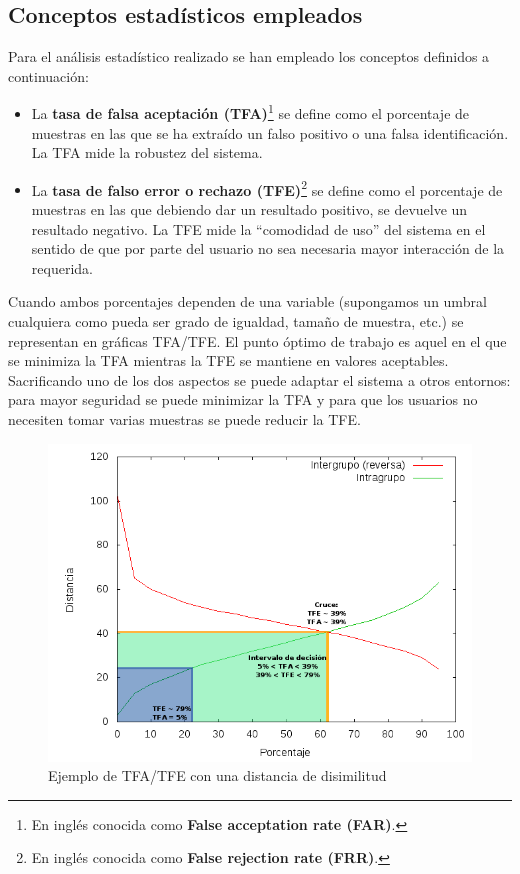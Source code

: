 \subsection{Conceptos estadísticos empleados}
Para el análisis estadístico realizado se han empleado los conceptos definidos a continuación\cite{FRRstatistics}:
\begin{itemize}
	\item{La \textbf{tasa de falsa aceptación (TFA)}\footnote{En inglés conocida como \textbf{False acceptation rate (FAR)}.} se define como el porcentaje de muestras en las que se ha extraído un falso positivo o una falsa identificación. La TFA mide la robustez del sistema.}
	\item{La \textbf{tasa de falso error o rechazo (TFE)}\footnote{En inglés conocida como \textbf{False rejection rate (FRR)}.} se define como el porcentaje de muestras en las que debiendo dar un resultado positivo, se devuelve un resultado negativo. La TFE mide la ``comodidad de uso'' del sistema en el sentido de que por parte del usuario no sea necesaria mayor interacción de la requerida. }
\end {itemize}

Cuando ambos porcentajes dependen de una variable (supongamos un umbral cualquiera como pueda ser grado de igualdad, tamaño de muestra, etc.) se representan en gráficas TFA/TFE. El punto óptimo de trabajo es aquel en el que se minimiza la TFA mientras la TFE se mantiene en valores aceptables. Sacrificando uno de los dos aspectos se puede adaptar el sistema a otros entornos: para mayor seguridad se puede minimizar la TFA y para que los usuarios no necesiten tomar varias muestras se puede reducir la TFE.

\begin{figure}[!hb]
	\centering
	\includegraphics[width=12cm]{imagenes/grafica_TFA.png}
	\caption{Ejemplo de TFA/TFE con una distancia de disimilitud}
	\label{fig:example_TFA}
\end{figure}

